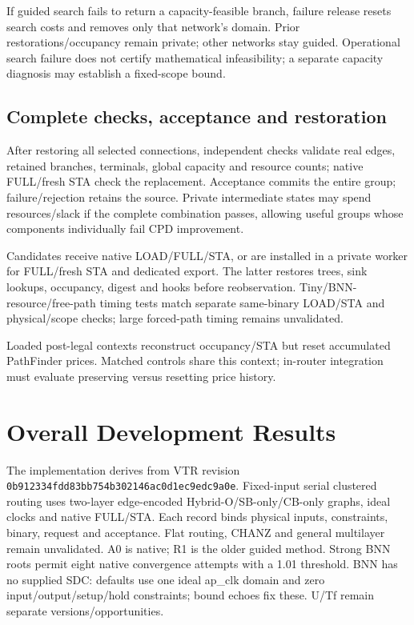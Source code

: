 \documentclass[conference,10pt]{IEEEtran}
\begin{document}
If guided search fails to return a capacity-feasible branch, failure release resets search costs and removes only that network's domain. Prior restorations/occupancy remain private; other networks stay guided. Operational search failure does not certify mathematical infeasibility; a separate capacity diagnosis may establish a fixed-scope bound.

\subsection{Complete checks, acceptance and restoration}
After restoring all selected connections, independent checks validate real edges, retained branches, terminals, global capacity and resource counts; native FULL/fresh STA check the replacement. Acceptance commits the entire group; failure/rejection retains the source. Private intermediate states may spend resources/slack if the complete combination passes, allowing useful groups whose components individually fail CPD improvement.

Candidates receive native LOAD/FULL/STA, or are installed in a private worker for FULL/fresh STA and dedicated export. The latter restores trees, sink lookups, occupancy, digest and hooks before reobservation. Tiny/BNN-resource/free-path timing tests match separate same-binary LOAD/STA and physical/scope checks; large forced-path timing remains unvalidated.

Loaded post-legal contexts reconstruct occupancy/STA but reset accumulated PathFinder prices. Matched controls share this context; in-router integration must evaluate preserving versus resetting price history.

\section{Overall Development Results}
The implementation derives from VTR revision \texttt{0b912334fdd83bb754b302146ac0d1ec9edc9a0e}. Fixed-input serial clustered routing uses two-layer edge-encoded Hybrid-O/SB-only/CB-only graphs, ideal clocks and native FULL/STA. Each record binds physical inputs, constraints, binary, request and acceptance. Flat routing, CHANZ and general multilayer remain unvalidated. A0 is native; R1 is the older guided method. Strong BNN roots permit eight native convergence attempts with a 1.01 threshold. BNN has no supplied SDC: defaults use one ideal ap\_clk domain and zero input/output/setup/hold constraints; bound echoes fix these. U/Tf remain separate versions/opportunities.
\end{document}
